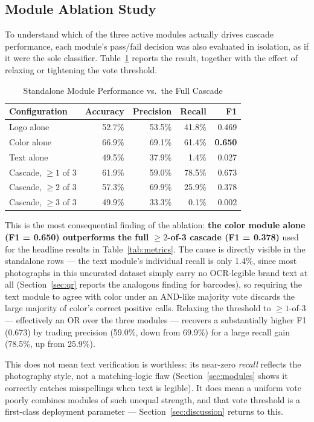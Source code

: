 \documentclass[conference]{IEEEtran}
\begin{document}
\subsection{Module Ablation Study}
\label{sec:ablation}

To understand which of the three active modules actually drives cascade
performance, each module's pass/fail decision was also evaluated in
isolation, as if it were the sole classifier. Table~\ref{tab:ablation}
reports the result, together with the effect of relaxing or tightening
the vote threshold.

\begin{table}[t]
\caption{Standalone Module Performance vs.\ the Full Cascade}
\label{tab:ablation}
\centering
\begin{tabular}{lrrrr}
\toprule
Configuration & Accuracy & Precision & Recall & F1 \\
\midrule
Logo alone         & 52.7\% & 53.5\% & 41.8\% & 0.469 \\
Color alone        & 66.9\% & 69.1\% & 61.4\% & \textbf{0.650} \\
Text alone         & 49.5\% & 37.9\% &  1.4\% & 0.027 \\
Cascade, $\geq 1$ of 3 & 61.9\% & 59.0\% & 78.5\% & 0.673 \\
Cascade, $\geq 2$ of 3 & 57.3\% & 69.9\% & 25.9\% & 0.378 \\
Cascade, $\geq 3$ of 3 & 49.9\% & 33.3\% &  0.1\% & 0.002 \\
\bottomrule
\end{tabular}
\end{table}

This is the most consequential finding of the ablation: \textbf{the
color module alone (F1 = 0.650) outperforms the full $\geq 2$-of-3
cascade (F1 = 0.378)} used for the headline results in
Table~\ref{tab:metrics}. The cause is directly visible in the standalone
rows --- the text module's individual recall is only 1.4\%, since most
photographs in this uncurated dataset simply carry no OCR-legible brand
text at all (Section~\ref{sec:qr} reports the analogous finding for
barcodes), so requiring the text module to agree with color under an
AND-like majority vote discards the large majority of color's correct
positive calls. Relaxing the threshold to $\geq 1$-of-3 --- effectively
an OR over the three modules --- recovers a substantially higher F1
(0.673) by trading precision (59.0\%, down from 69.9\%) for a large
recall gain (78.5\%, up from 25.9\%).

This does not mean text verification is worthless: its near-zero
\emph{recall} reflects the photography style, not a matching-logic flaw
(Section~\ref{sec:modules} shows it correctly catches misspellings when
text is legible). It does mean a uniform vote poorly combines modules of
such unequal strength, and that vote threshold is a first-class
deployment parameter --- Section~\ref{sec:discussion} returns to this.
\end{document}
